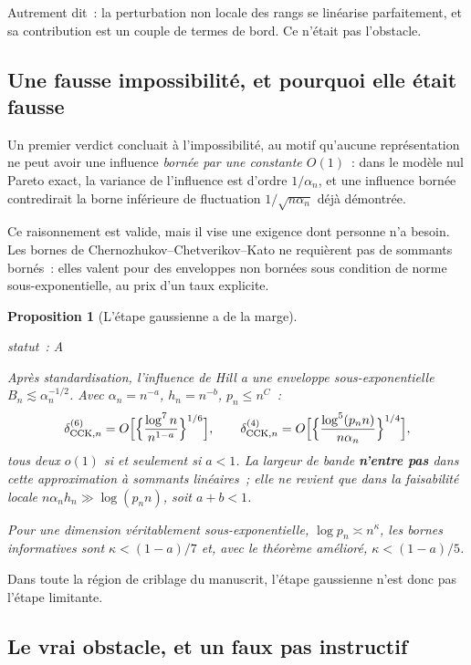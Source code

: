 \documentclass[11pt]{article}
\theoremstyle{plain}
\newtheorem{proposition}[theoreme]{Proposition}
\theoremstyle{definition}
\theoremstyle{remark}
\newcommand{\1}{\mathbf 1}
\newcommand{\statut}[1]{%
  \nopagebreak\par\nopagebreak
  \hfill{\normalfont\footnotesize\textcolor{gris}{statut~: #1}}%
  \par\nopagebreak\vspace{-2pt}}
\begin{document}
\noindent
Autrement dit~: la perturbation non locale des rangs se linéarise
parfaitement, et sa contribution est un couple de termes de bord. Ce
n'était pas l'obstacle.

\subsection{Une fausse impossibilité, et pourquoi elle était fausse}

Un premier verdict concluait à l'impossibilité, au motif qu'aucune
représentation ne peut avoir une influence \emph{bornée par une constante
$O(1)$}~: dans le modèle nul Pareto exact, la variance de l'influence est
d'ordre $1/\alpha_n$, et une influence bornée contredirait la borne
inférieure de fluctuation $1/\sqrt{n\alpha_n}$ déjà démontrée.

Ce raisonnement est valide, mais il vise une exigence dont personne n'a
besoin. Les bornes de
Chernozhukov--Chetverikov--Kato ne requièrent pas de sommants bornés~:
elles valent pour des enveloppes non bornées sous condition de norme
sous-exponentielle, au prix d'un taux explicite.

\begin{proposition}[L'étape gaussienne a de la marge]
\label{prop:cck}
\statut{A}
Après standardisation, l'influence de Hill a une enveloppe
sous-exponentielle $B_n\lesssim\alpha_n^{-1/2}$. Avec $\alpha_n=n^{-a}$,
$h_n=n^{-b}$, $p_n\le n^C$~:
\[
 \delta^{(6)}_{\mathrm{CCK},n}
 =O\Bigl[\Bigl\{\frac{\log^7n}{n^{1-a}}\Bigr\}^{1/6}\Bigr],
 \qquad
 \delta^{(4)}_{\mathrm{CCK},n}
 =O\Bigl[\Bigl\{\frac{\log^5(p_nn)}{n\alpha_n}\Bigr\}^{1/4}\Bigr],
\]
tous deux $o(1)$ si et seulement si $a<1$. La largeur de bande
\textbf{n'entre pas} dans cette approximation à sommants linéaires~; elle
ne revient que dans la faisabilité locale $n\alpha_nh_n\gg\log(p_nn)$,
soit $a+b<1$.

Pour une dimension véritablement sous-exponentielle,
$\log p_n\asymp n^\kappa$, les bornes informatives sont
$\kappa<(1-a)/7$ et, avec le théorème amélioré, $\kappa<(1-a)/5$.
\end{proposition}

\noindent
Dans toute la région de criblage du manuscrit, l'étape gaussienne n'est
donc pas l'étape limitante.

\subsection{Le vrai obstacle, et un faux pas instructif}
\end{document}
